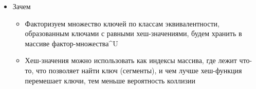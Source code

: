 \documentclass[xetex,mathserif,serif]{beamer}
\begin{document}
\begin{frame}
        \begin{itemize}
            \item Зачем
            \begin{itemize}
                \item Факторизуем множество ключей по классам эквивалентности, образованным ключами с равными хеш-значениями, будем хранить в массиве фактор-множества\^{}U
                \item Хеш-значения можно использовать как индексы массива, где лежит что-то, что позволяет найти ключ (сегменты), и чем лучше хеш-функция перемешает ключи, тем меньше вероятность коллизии
            \end{itemize}
        \end{itemize}
    \end{frame}
\end{document}
